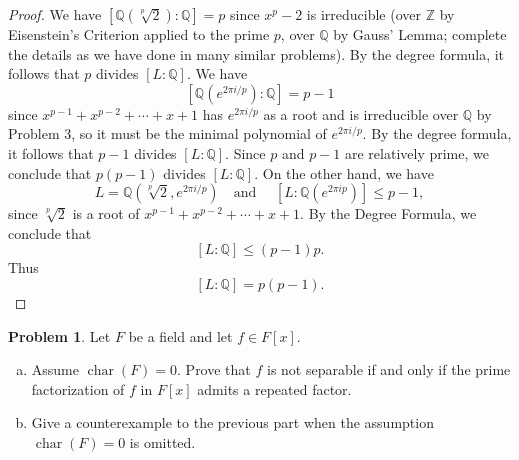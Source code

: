 \documentclass[11pt]{article}
\DeclareMathOperator{\ch}{char}
\newcommand{\Q}{\mathbb{Q}}
\newcommand{\Z}{\mathbb{Z}}
\theoremstyle{definition}
\newtheorem{problem}{Problem}
\begin{document}
\begin{proof}
We have $[\Q(\sqrt[p]{2}):\Q] = p$ since $x^p - 2$ is irreducible (over $\Z$ by Eisenstein's Criterion applied to the prime $p$, over $\Q$ by Gauss' Lemma; complete the details as we have done in many similar problems). 
By the degree formula, it follows that $p$ divides $[L: \Q]$. We have 
$$[\Q(e^{2 \pi i/p}):\Q] = p-1$$ 
since $x^{p-1} + x^{p-2} + \cdots + x + 1$ has $e^{2 \pi i/p}$ as a root and is irreducible over $\Q$ by Problem 3, so it must be the minimal polynomial of $e^{2 \pi i/p}$.
By the degree formula, it follows that $p-1$ divides $[L: \Q]$. Since $p$ and $p-1$ are relatively prime, we conclude that $p(p-1)$ divides $[L:\Q]$. On the other hand, we have 
$$L = \Q(\sqrt[p]{2}, e^{2 \pi i/p}) \quad \textrm{and } \quad [L: \Q(e^{2 \pi ip})] \leqslant p-1,$$ 
since $\sqrt[p]{2}$ is a root of $x^{p-1} + x^{p-2} + \cdots + x + 1$. By the Degree Formula, we conclude that 
$$[L:\Q] \leqslant (p-1)p.$$ 
Thus 
$$[L: \Q] = p(p-1).$$
\end{proof}


\begin{problem}
Let $F$ be a field and let $f \in F[x]$.
\begin{enumerate}[(a)]
\item Assume $\ch(F) = 0$. Prove that $f$ is not separable if and only if the prime factorization of $f$ in $F[x]$ admits a repeated factor.

\item Give a counterexample to the previous part when the assumption $\ch(F) = 0$ is omitted.
\end{enumerate}
\end{problem}
\end{document}
